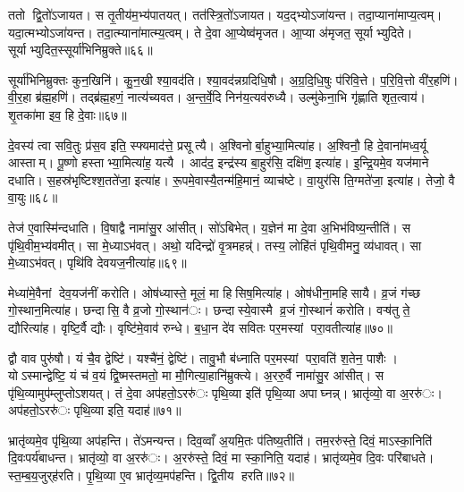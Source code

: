 ततो द्वि॒तो॑ऽजायत। स तृ॒तीय॑म॒भ्य॑पातयत्। तत॑स्त्रि॒तो॑ऽजायत। यद॒द्भ्योऽजा॑यन्त। तदा॒प्याना॑माप्य॒त्वम्। यदा॒त्मभ्योऽजा॑यन्त। तदा॒त्म्याना॑मात्म्य॒त्वम्। ते दे॒वा आ॒प्येष्व॑मृजत। आ॒प्या अ॑मृजत॒ सूर्याभ्युदिते। सूर्याभ्युदित॒स्सूर्या॑भिनिम्रुक्ते॥६६॥

सूर्या॑भिनिम्रुक्तः कुन॒खिनि॑। कु॒न॒खी श्या॒वद॑ति। श्या॒वद॑न्नग्रदिधि॒षौ। अ॒ग्र॒दि॒धि॒षुः प॑रिवि॒त्ते। प॒रि॒वि॒त्तो वी॑र॒हणि॑। वी॒र॒हा ब्र॑ह्म॒हणि॑। तद्ब्र॑ह्म॒हणं॒ नात्य॑च्यवत। अ॒न्त॒र्वे॒दि निन॑य॒त्यव॑रुध्यै। उल्मु॑केना॒भि गृ॑ह्णाति शृत॒त्वाय॑। शृ॒तका॑मा इव॒ हि दे॒वाः॥६७॥


दे॒वस्य॑ त्वा सवि॒तुः प्र॑स॒व इति॒ स्फ्यमाद॑त्ते॒ प्रसूत्यै। अ॒श्विनोर्बा॒हुभ्या॒मित्या॑ह। अ॒श्विनौ॒ हि दे॒वाना॑मध्व॒र्यू आस्ताम्। पू॒ष्णो हस्ताभ्या॒मित्या॑ह॒ यत्यै। आद॑द॒ इन्द्र॑स्य बा॒हुर॑सि॒ दक्षि॑ण॒ इत्या॑ह। इ॒न्द्रि॒यमे॒व यज॑माने दधाति। स॒हस्र॑भृष्टिश्श॒तते॑जा॒ इत्या॑ह। रू॒पमे॒वास्यै॒तन्म॑हि॒मानं॒ व्याच॑ष्टे। वा॒युर॑सि ति॒ग्मते॑जा॒ इत्या॑ह। तेजो॒ वै वा॒युः॥६८॥

तेज॑ ए॒वास्मि॑न्दधाति। वि॒षाद्वै नामा॑सु॒र आ॑सीत्। सो॑ऽबिभेत्। य॒ज्ञेन॑ मा दे॒वा अ॒भिभ॑विष्य॒न्तीति॑। स पृ॑थि॒वीम॒भ्य॑वमीत्। सा मे॒ध्याऽभ॑वत्। अथो॒ यदिन्द्रो॑ वृ॒त्रमहन्न्॑। तस्य॒ लोहि॑तं पृथि॒वीमनु॒ व्य॑धावत्। सा मे॒ध्याऽभ॑वत्। पृथि॑वि देवयज॒नीत्या॑ह॥६९॥

मेध्या॑मे॒वैनां देव॒यज॑नीं करोति। ओष॑ध्यास्ते॒ मूलं॒ मा हिसिष॒मित्या॑ह। ओष॑धीना॒महिसायै। व्र॒जं ग॑च्छ गो॒स्थान॒मित्या॑ह। छन्दासि॒ वै व्र॒जो गो॒स्थान॑ः। छन्दास्ये॒वास्मै व्र॒जं गो॒स्थानं॑ करोति। वऱ्ष॑तु ते॒ द्यौरित्या॑ह। वृष्टि॒र्वै द्यौः। वृष्टि॑मे॒वाव॑ रुन्धे। ब॒धा॒न दे॑व सवितः पर॒मस्यां परा॒वतीत्या॑ह॥७०॥

द्वौ वाव पुरु॑षौ। यं चै॒व द्वेष्टि॑। यश्चै॑नं॒ द्वेष्टि॑। तावु॒भौ ब॑ध्नाति पर॒मस्यां परा॒वति॑ श॒तेन॒ पाशैः। योऽस्मान्द्वेष्टि॒ यं च॑ व॒यं द्वि॒ष्मस्तमतो॒ मा मौ॒गित्या॒हानि॑म्रुक्त्ये। अ॒ररु॒र्वै नामा॑सु॒र आ॑सीत्। स पृ॑थि॒व्यामुप॑म्लुप्तोऽशयत्। तं दे॒वा अप॑हतो॒ऽररु॑ः पृथि॒व्या इति॑ पृथि॒व्या अपाघ्नन्न्। भ्रातृ॑व्यो॒ वा अ॒ररु॑ः। अप॑हतो॒ऽररु॑ः पृथि॒व्या इति॒ यदाह॑॥७१॥

भ्रातृ॑व्यमे॒व पृ॑थि॒व्या अप॑हन्ति। ते॑ऽमन्यन्त। दिव॒व्वाँ अ॒यमि॒तः प॑तिष्य॒तीति॑। तम॒ररु॑स्ते॒ दिवं॒ माऽस्का॒निति॑ दि॒वःपर्य॑बाधन्त। भ्रातृ॑व्यो॒ वा अ॒ररु॑ः। अ॒ररु॑स्ते॒ दिवं॒ मा स्का॒निति॒ यदाह॑। भ्रातृ॑व्यमे॒व दि॒वः परि॑बाधते। स्त॒म्ब॒य॒जुर्‌ह॑रति। पृ॒थि॒व्या ए॒व भ्रातृ॑व्य॒मप॑हन्ति। द्वि॒तीय हरति॥७२॥


